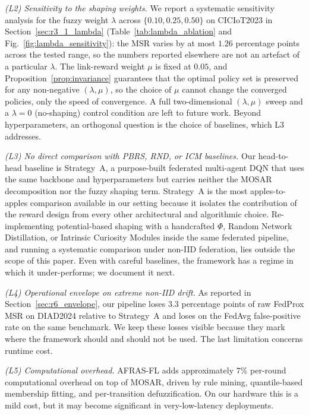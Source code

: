 \documentclass[ai,article,submit,moreauthors,pdftex]{Definitions/mdpi}
\begin{document}
\emph{(L2) Sensitivity to the shaping weights.} We report a
systematic sensitivity analysis for the fuzzy weight $\lambda$
across $\{0.10, 0.25, 0.50\}$ on CICIoT2023 in
Section~\ref{sec:r3_1_lambda} (Table~\ref{tab:lambda_ablation} and
Fig.~\ref{fig:lambda_sensitivity}): the MSR varies by at most
$1.26$ percentage points across the tested range, so the numbers
reported elsewhere are not an artefact of a particular $\lambda$.
The link-reward weight $\mu$ is fixed at $0.05$, and
Proposition~\ref{prop:invariance} guarantees that the optimal
policy set is preserved for any non-negative $(\lambda, \mu)$, so
the choice of $\mu$ cannot change the converged policies, only the
speed of convergence. A full two-dimensional $(\lambda, \mu)$
sweep and a $\lambda = 0$ (no-shaping) control condition are left
to future work. Beyond hyperparameters, an orthogonal question is
the choice of baselines, which L3 addresses.

\emph{(L3) No direct comparison with PBRS, RND, or ICM baselines.}
Our head-to-head baseline is Strategy~A, a purpose-built federated
multi-agent DQN that uses the same backbone and hyperparameters
but carries neither the MOSAR decomposition nor the fuzzy shaping
term. Strategy~A is the most apples-to-apples comparison available
in our setting because it isolates the contribution of the reward
design from every other architectural and algorithmic choice.
Re-implementing potential-based shaping with a handcrafted $\Phi$,
Random Network Distillation, or Intrinsic Curiosity Modules inside
the same federated pipeline, and running a systematic comparison
under non-IID federation, lies outside the scope of this paper.
Even with careful baselines, the framework has a regime in which
it under-performs; we document it next.

\emph{(L4) Operational envelope on extreme non-IID drift.} As
reported in Section~\ref{sec:r6_envelope}, our pipeline loses $3.3$
percentage points of raw FedProx MSR on DIAD2024 relative to
Strategy~A and loses on the FedAvg false-positive rate on the same
benchmark. We keep these losses visible because they mark where the
framework should and should not be used. The last limitation
concerns runtime cost.

\emph{(L5) Computational overhead.} AFRAS-FL adds approximately
$7\%$ per-round computational overhead on top of MOSAR, driven by
rule mining, quantile-based membership fitting, and per-transition
defuzzification. On our hardware this is a mild cost, but it may
become significant in very-low-latency deployments.
\end{document}
